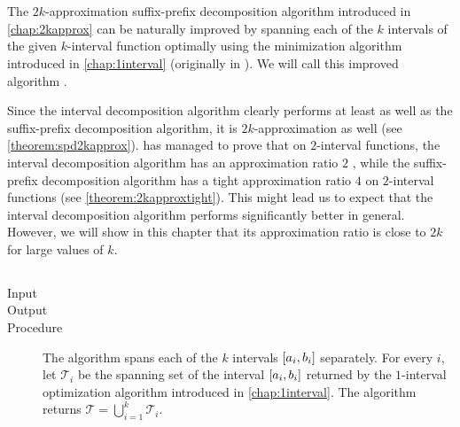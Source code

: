 \chapter{}
\label{chap:betterapprox}

The $2k$-approximation
suffix-prefix decomposition algorithm
introduced in \cref{chap:2kapprox}
can be naturally improved
by spanning each of the $k$ intervals
of the given $k$-interval function
optimally using the minimization algorithm
introduced in \cref{chap:1interval}
(originally in \citet{Schieber2005154}).
We will call this improved algorithm
.

Since the interval decomposition algorithm
clearly performs at least as well
as the suffix-prefix decomposition algorithm,
it is $2k$-approximation as well
(see \cref{theorem:spd2kapprox}).
\citeauthor{Dubovsky2012} has managed
to prove that on $2$-interval functions,
the interval decomposition algorithm
has an approximation ratio $2$
\citep[p.~39]{Dubovsky2012}, %
while the suffix-prefix decomposition algorithm
has a tight approximation ratio $4$
on $2$-interval functions
(see \cref{theorem:2kapproxtight}).
This might lead us to expect
that the interval decomposition algorithm
performs significantly better in general.
However,
we will show in this chapter that its approximation ratio
is close to $2k$ for large values of $k$.

\section{\algdesctitle}


\begin{algorithm}
\label{algorithm:id}

\hfill

\begin{description}
\item[Input]
\minintinput

\item[Output]
\minintoutput

\item[Procedure]
The algorithm spans each of the $k$ intervals
$[a_i, b_i]$ separately.
For every $i$,
let $\mathcal{T}_i$ be the spanning set of the interval
$[a_i, b_i]$ returned by the $1$-interval
optimization algorithm
introduced in \cref{chap:1interval}.
The algorithm returns
$\mathcal{T} = \bigcup_{i=1}^k{\mathcal{T}_i}$.
\end{description}
\end{algorithm}

